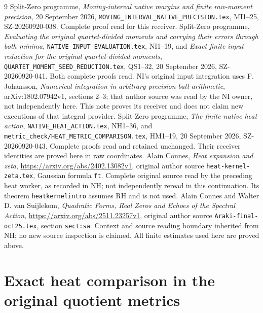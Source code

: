 \documentclass[11pt]{article}
\begin{document}
\begin{thebibliography}{9}
 Split-Zero programme, \emph{Moving-interval native margins
and finite raw-moment precision}, 20 September 2026,
\texttt{MOVING\_INTERVAL\_NATIVE\_PRECISION.tex}, MI1--25,
SZ-20260920-038. Complete proof read for this receiver.
 Split-Zero programme, \emph{Evaluating the original
quartet-divided moments and carrying their errors through both minima},
\texttt{NATIVE\_INPUT\_EVALUATION.tex}, NI1--19, and
\emph{Exact finite input reduction for the original quartet-divided moments},
\texttt{QUARTET\_MOMENT\_SEED\_REDUCTION.tex}, QS1--32,
20 September 2026, SZ-20260920-041. Both complete proofs read.
NI's original input integration uses F. Johansson,
\emph{Numerical integration in arbitrary-precision ball arithmetic},
arXiv:1802.07942v1, sections 2--3; that author source was read by the
NI owner, not independently here. This note proves its receiver and
does not claim new executions of that integral provider.
 Split-Zero programme, \emph{The finite native heat action},
\texttt{NATIVE\_HEAT\_ACTION.tex}, NH1--36, and
\texttt{metric\_check/HEAT\_METRIC\_COMPARISON.tex}, HM1--19,
20 September 2026, SZ-20260920-043. Complete proofs read and retained
unchanged. Their receiver identities are proved here in raw coordinates.
 Alain Connes, \emph{Heat expansion and zeta},
\url{https://arxiv.org/abs/2402.13082v1}, original author source
\texttt{heat-kernel-zeta.tex}, Gaussian formula \texttt{ft}.
Complete original source read by the preceding heat worker, as recorded
in NH; not independently reread in this continuation. Its theorem
\texttt{heatkernelintro} assumes RH and is not used.
 Alain Connes and Walter D. van Suijlekom,
\emph{Quadratic Forms, Real Zeros and Echoes of the Spectral Action},
\url{https://arxiv.org/abs/2511.23257v1}, original author source
\texttt{Araki-final-oct25.tex}, section \texttt{sect:sa}.
Context and source reading boundary inherited from NH; no new source
inspection is claimed. All finite estimates used here are proved above.
\end{thebibliography}

\endgroup

\clearpage\begingroup
\part*{Exact heat comparison in the original quotient metrics}
\newtheorem{hemtheorem}{Theorem}
\newtheorem{hemlemma}{Lemma}
\newcommand{\hemtr}{\operatorname{tr}}
\newcommand{\hemrank}{\operatorname{rank}}
\newcommand{\hemadjzero}{\dagger_0}
\newcommand{\hemadjg}{\dagger_G}
\newcommand{\hemRea}{\operatorname{Re}}
\end{document}
